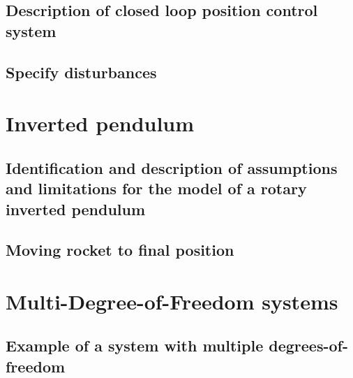 \documentclass[11pt]{article}
\numberwithin{equation}{section}
\begin{document}
\subsection{Description of closed loop position control system}
\subsection{Specify disturbances}
\section{Inverted pendulum}
\subsection{Identification and description of assumptions and limitations for the model of a rotary inverted pendulum}
\subsection{Moving rocket to final position}
\section{Multi-Degree-of-Freedom systems}
\subsection{Example of a system with multiple degrees-of-freedom}
\end{document}
